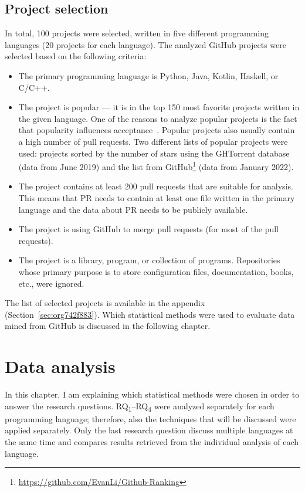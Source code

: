 \documentclass[digital,oneside,oldtable,nolof,nolot,nocover]{fithesis4}
\begin{document}
\section{Project selection}
\label{sec:org8ed73d7}
In total, 100 projects were selected, written in five different
programming languages (20 projects for each language). The analyzed GitHub
projects were selected based on the following criteria:
\begin{itemize}
\item The primary programming language is Python, Java, Kotlin, Haskell, or C/C++.
\item The project is popular --- it is in the top 150 most favorite projects written in the given language.
One of the reasons to analyze popular projects is the fact that popularity influences acceptance~\cite{social}.
Popular projects also usually contain a high number of pull requests.
Two different lists of popular projects were used: projects sorted by the
number of stars using the GHTorrent database (data from  June 2019) and the list from
GitHub\footnote{\url{https://github.com/EvanLi/Github-Ranking}} (data from  January 2022).
\item The project contains at least 200 pull requests that are suitable for analysis.
This means that PR needs to contain at least one file written in the
primary language and the data about PR needs to be publicly available.
\item The project is using GitHub to merge pull requests (for most of the pull requests).
\item The project is a library, program, or collection of programs. Repositories whose primary purpose is
to store configuration files, documentation, books, etc., were ignored.
\end{itemize}
The list of selected projects is available in the appendix (Section~\ref{sec:org742f883}). Which statistical
methods were used to evaluate data mined from GitHub is discussed in the following chapter.
\chapter{Data analysis}
\label{sec:orgefa69c5}
In this chapter, I am explaining which statistical methods were chosen in
order to answer the research questions. RQ\textsubscript{1}--RQ\textsubscript{4} were
analyzed separately for each programming language; therefore, also the
techniques that will be discussed were applied separately.  Only the last
research question discuss multiple languages at the same time and compares
results retrieved from the individual analysis of each language.
\end{document}
